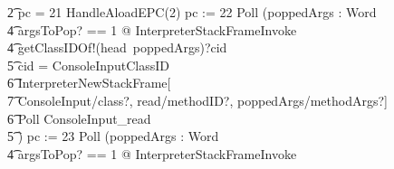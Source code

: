 \begin{figure}[t!]
\begin{circus}
    \t2 {} \circelse pc = 21 \circthen HandleAloadEPC(2) \circseq pc := 22 \circseq Poll \circseq (\circvar poppedArgs : \seq Word \circspot \\
    \t4 \lschexpract \exists argsToPop?  == 1 @ InterpreterStackFrameInvoke \rschexpract \circseq \\
    \t4 getClassIDOf!(head~poppedArgs)?cid \then {} \\
    \t5 \circif cid = ConsoleInputClassID \circthen {} \\
    \t6 \lschexpract InterpreterNewStackFrame[\\
    \t7 ConsoleInput/class?, read/methodID?, poppedArgs/methodArgs?] \rschexpract \circseq \\
    \t6 Poll \circseq ConsoleInput\_read \\
    \t5 \circfi) \circseq pc := 23 \circseq Poll \circseq (\circvar poppedArgs : \seq Word \circspot \\
    \t4 \lschexpract \exists argsToPop? == 1 @ InterpreterStackFrameInvoke \rschexpract \circseq \\

\end{circus}
\end{figure}
